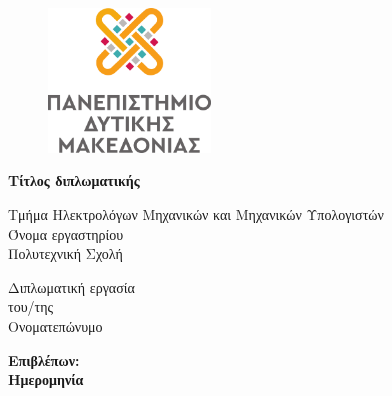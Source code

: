 \begin{titlepage}

\begin{figure}[h!]
  \begin{center}
  \vspace{-1cm}
    \includegraphics[width=4.3cm]{logos/gr/uowm-logo-vertical-gr.png}
    \label{fig:cover_uowm_logo}
  \end{center}
\end{figure}

\vspace{\fill}

\Large \centering \textbf{Τίτλος διπλωματικής}

\vspace{\fill}

\begin{center}
    \normalsize Τμήμα Ηλεκτρολόγων Μηχανικών και Μηχανικών Υπολογιστών \\
    \normalsize Όνομα εργαστηρίου \\
    \normalsize Πολυτεχνική Σχολή
\end{center}

\vspace{\fill}

\begin{center}
    \normalsize Διπλωματική εργασία \\
    \normalsize του/της \\
    \normalsize Ονοματεπώνυμο
\end{center}

\vspace{\fill}

\begin{center}
    \normalsize \textbf{Επιβλέπων:} \\
    \normalsize \textbf{Ημερομηνία}
\end{center}

\end{titlepage}
